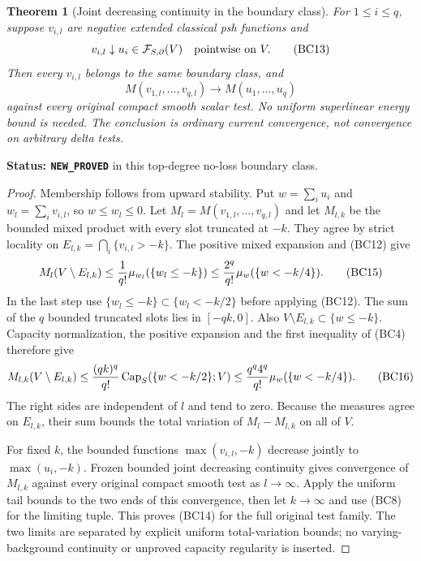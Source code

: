 \documentclass[11pt,a4paper]{article}
\numberwithin{equation}{section}
\newtheorem{theorem}{Theorem}[section]
\theoremstyle{definition}
\theoremstyle{remark}
\begin{document}
\begin{theorem}[Joint decreasing continuity in the boundary class]
\label{thm:r11-boundary-joint-decreasing}
For $1\leq i\leq q$, suppose $v_{i,l}$ are negative extended
classical psh functions and
\[
              v_{i,l}\downarrow u_i\in\mathcal F_{S,\partial}(V)
                         \quad\hbox{pointwise on }V.
 \tag{BC13}
\]
Then every $v_{i,l}$ belongs to the same boundary class, and
\[
       M(v_{1,l},\ldots,v_{q,l})
                       \longrightarrow M(u_1,\ldots,u_q)
 \tag{BC14}
\]
against every original compact smooth scalar test. No uniform
superlinear energy bound is needed. The conclusion is ordinary
current convergence, not convergence on arbitrary delta tests.
\end{theorem}

\noindent\textbf{Status: \texttt{NEW\_PROVED}} in this top-degree
no-loss boundary class.

\begin{proof}
Membership follows from upward stability. Put $w=\sum_i u_i$
and $w_l=\sum_i v_{i,l}$, so $w\leq w_l\leq0$. Let
$M_l=M(v_{1,l},\ldots,v_{q,l})$ and let $M_{l,k}$ be the
bounded mixed product with every slot truncated at $-k$.
They agree by strict locality on
$E_{l,k}=\bigcap_i\{v_{i,l}>-k\}$. The positive mixed expansion
and (BC12) give
\[
 M_l(V\setminus E_{l,k})
 \leq {1\over q!}\mu_{w_l}(\{w_l\leq-k\})
 \leq {2^q\over q!}\mu_w(\{w<-k/4\}).
 \tag{BC15}
\]
In the last step use $\{w_l\leq-k\}\subset\{w_l<-k/2\}$
before applying (BC12).
The sum of the $q$ bounded truncated slots lies in $[-qk,0]$.
Also $V\setminus E_{l,k}\subset\{w\leq-k\}$. Capacity
normalization, the positive expansion and the first inequality
of (BC4) therefore give
\[
 M_{l,k}(V\setminus E_{l,k})
 \leq{(qk)^q\over q!}\operatorname{Cap}_S(\{w<-k/2\};V)
 \leq{q^q4^q\over q!}\mu_w(\{w<-k/4\}).
 \tag{BC16}
\]
The right sides are independent of $l$ and tend to zero.
Because the measures agree on $E_{l,k}$, their sum bounds the
total variation of $M_l-M_{l,k}$ on all of $V$.

For fixed $k$, the bounded functions
$\max(v_{i,l},-k)$ decrease jointly to $\max(u_i,-k)$.
Frozen bounded joint decreasing continuity gives convergence of
$M_{l,k}$ against every original compact smooth test as
$l\to\infty$. Apply the uniform tail bounds to the two ends
of this convergence, then let $k\to\infty$ and use (BC8) for
the limiting tuple. This proves (BC14) for the full original
test family. The two limits are separated by explicit uniform
total-variation bounds; no varying-background continuity or
unproved capacity regularity is inserted.
\end{proof}
\end{document}
